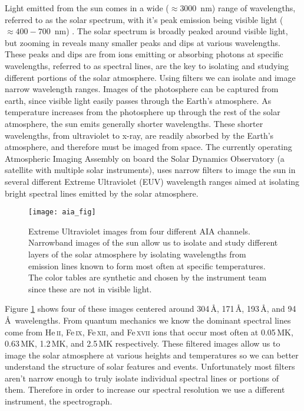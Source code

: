 Light emitted from the sun comes in a wide ($\approx3000$\, nm) range of wavelengths, referred to as the solar spectrum, with it's peak emission being visible light ($\approx400-700$\, nm) \citep{JudgeBook}.
The solar spectrum is broadly peaked around visible light, but zooming in reveals many smaller peaks and dips at various wavelengths. 
These peaks and dips are from ions emitting or absorbing photons at specific wavelengths, referred to as spectral lines, are the key to isolating and studying different portions of the solar atmosphere.
Using filters we can isolate and image narrow wavelength ranges.
Images of the photosphere can be captured from earth, since visible light easily passes through the Earth's atmosphere.
As temperature increases from the photosphere up through the rest of the solar atmosphere, the sun emits generally shorter wavelengths. 
These shorter wavelengths, from ultraviolet to x-ray, are readily absorbed by the Earth's atmosphere, and therefore must be imaged from space. 
The currently operating Atmospheric Imaging Assembly \citep[AIA:][]{Lemen2012} on board the Solar Dynamics Observatory (a satellite with multiple solar instruments), uses narrow filters to image the sun in several different Extreme Ultraviolet (EUV) wavelength ranges aimed at isolating bright spectral lines emitted by the solar atmosphere.
\begin{figure}
	\texttt{[image: aia\_fig]}
	\caption{Extreme Ultraviolet images from four different AIA channels. Narrowband images of the sun allow us to isolate and study different layers of the solar atmosphere by isolating wavelengths from emission lines known to form most often at specific temperatures. The color tables are synthetic and chosen by the instrument team since these are not in visible light. }
	\label{fig:AIA}
\end{figure}
Figure \ref{fig:AIA} shows four of these images centered around 304\,\AA, 171\,\AA, 193\,\AA, and 94\,\AA\  wavelengths.
From quantum mechanics we know the dominant spectral lines come from He\,\textsc{ii}, Fe\,\textsc{ix}, Fe\,\textsc{xii}, and Fe\,\textsc{xvii}  ions that occur most often at 0.05\,MK, 0.63\,MK, 1.2\,MK, and 2.5\,MK respectively.
These filtered images allow us to image the solar atmosphere at various heights and temperatures so we can better understand the structure of solar features and events.
Unfortunately most filters aren't narrow enough to truly isolate individual spectral lines or portions of them.
Therefore in order to increase our spectral resolution we use a different instrument, the spectrograph.

